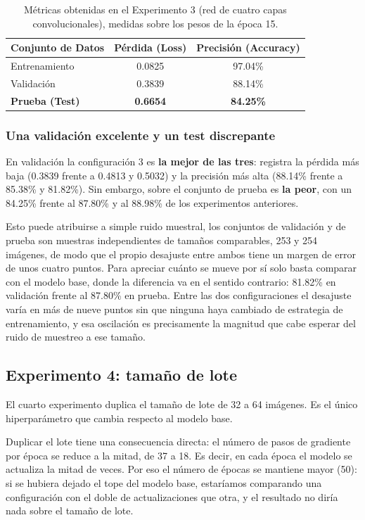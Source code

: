 \documentclass[11pt, a4paper]{article}
\begin{document}
\begin{table}[H]
\centering
\caption{Métricas obtenidas en el Experimento 3 (red de cuatro capas convolucionales), medidas sobre los pesos de la época 15.}
\label{tab:resultados_exp3}
\begin{tabular}{l c c}
\toprule
\textbf{Conjunto de Datos} & \textbf{Pérdida (Loss)} & \textbf{Precisión (Accuracy)} \\
\midrule
Entrenamiento & 0.0825 & 97.04\% \\
Validación & 0.3839 & 88.14\% \\
\textbf{Prueba (Test)} & \textbf{0.6654} & \textbf{84.25\%} \\
\bottomrule
\end{tabular}
\end{table}

\subsubsection{Una validación excelente y un test discrepante}

 En validación la configuración 3 es \textbf{la mejor de las tres}: registra la pérdida más baja (0.3839 frente a 0.4813 y 0.5032) y la precisión más alta (88.14\% frente a 85.38\% y 81.82\%). Sin embargo, sobre el conjunto de prueba es \textbf{la peor}, con un 84.25\% frente al 87.80\% y al 88.98\% de los experimentos anteriores.

Esto puede atribuirse a simple ruido muestral, los conjuntos de validación y de prueba son muestras independientes de tamaños comparables, 253 y 254 imágenes, de modo que el propio desajuste entre ambos tiene un margen de error de unos cuatro puntos. Para apreciar cuánto se mueve por sí solo basta comparar con el modelo base, donde la diferencia va en el sentido contrario: 81.82\% en validación frente al 87.80\% en prueba. Entre las dos configuraciones el desajuste varía en más de nueve puntos sin que ninguna haya cambiado de estrategia de entrenamiento, y esa oscilación es precisamente la magnitud que cabe esperar del ruido de muestreo a ese tamaño.

\subsection{Experimento 4: tamaño de lote}

El cuarto experimento duplica el tamaño de lote de 32 a 64 imágenes. Es el único hiperparámetro que cambia respecto al modelo base.

Duplicar el lote tiene una consecuencia directa: el número de pasos de gradiente por época se reduce a la mitad, de 37 a 18. Es decir, en cada época el modelo se actualiza la mitad de veces. Por eso el número de épocas se mantiene mayor (50): si se hubiera dejado el tope del modelo base, estaríamos comparando una configuración con el doble de actualizaciones que otra, y el resultado no diría nada sobre el tamaño de lote.
\end{document}
